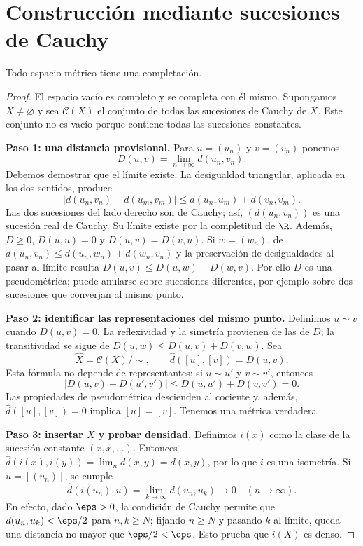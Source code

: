 \section{Construcción mediante sucesiones de Cauchy}
\begin{teorema}\label{ch09:existencia}
Todo espacio métrico tiene una completación.
\end{teorema}
\begin{proof}
El espacio vacío es completo y se completa con él mismo. Supongamos $X\ne\varnothing$ y sea $\mathcal C(X)$ el conjunto de todas las sucesiones de Cauchy de $X$. Este conjunto no es vacío porque contiene todas las sucesiones constantes.

\textbf{Paso 1: una distancia provisional.} Para $u=(u_n)$ y $v=(v_n)$ ponemos
\[
 D(u,v)=\lim_{n\to\infty}d(u_n,v_n).
\]
Debemos demostrar que el límite existe. La desigualdad triangular, aplicada en los dos sentidos, produce
\[
 |d(u_n,v_n)-d(u_m,v_m)|\leq d(u_n,u_m)+d(v_n,v_m).
\]
Las dos sucesiones del lado derecho son de Cauchy; así, $(d(u_n,v_n))$ es una sucesión real de Cauchy. Su límite existe por la completitud de $\R$. Además, $D\geq0$, $D(u,u)=0$ y $D(u,v)=D(v,u)$. Si $w=(w_n)$, de $d(u_n,v_n)\leq d(u_n,w_n)+d(w_n,v_n)$ y la preservación de desigualdades al pasar al límite resulta $D(u,v)\leq D(u,w)+D(w,v)$. Por ello $D$ es una pseudométrica; puede anularse sobre sucesiones diferentes, por ejemplo sobre dos sucesiones que converjan al mismo punto.

\textbf{Paso 2: identificar las representaciones del mismo punto.} Definimos $u\sim v$ cuando $D(u,v)=0$. La reflexividad y la simetría provienen de las de $D$; la transitividad se sigue de $D(u,w)\leq D(u,v)+D(v,w)$. Sea
\[
 \widehat X=\mathcal C(X)/\!\sim,
 \qquad \widehat d([u],[v])=D(u,v).
\]
Esta fórmula no depende de representantes: si $u\sim u'$ y $v\sim v'$, entonces
\[
 |D(u,v)-D(u',v')|\leq D(u,u')+D(v,v')=0.
\]
Las propiedades de pseudométrica descienden al cociente y, además, $\widehat d([u],[v])=0$ implica $[u]=[v]$. Tenemos una métrica verdadera.

\textbf{Paso 3: insertar $X$ y probar densidad.} Definimos $i(x)$ como la clase de la sucesión constante $(x,x,\ldots)$. Entonces $\widehat d(i(x),i(y))=\lim_nd(x,y)=d(x,y)$, por lo que $i$ es una isometría. Si $u=[(u_n)]$, se cumple
\[
 \widehat d(i(u_n),u)=\lim_{k\to\infty}d(u_n,u_k)\longrightarrow0
 \quad(n\to\infty).
\]
En efecto, dado $\eps>0$, la condición de Cauchy permite que $d(u_n,u_k)<\eps/2$ para $n,k\geq N$; fijando $n\geq N$ y pasando $k$ al límite, queda una distancia no mayor que $\eps/2<\eps$. Esto prueba que $i(X)$ es denso.


\end{proof}
